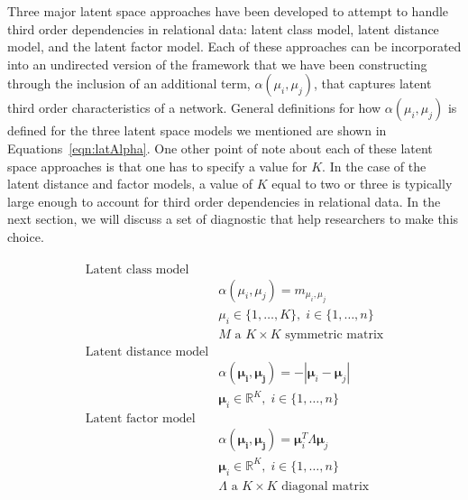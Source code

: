 Three major latent space approaches have been developed to attempt to handle third order dependencies in relational data: latent class model, latent distance model, and the latent factor model. Each of these approaches can be incorporated into an undirected version of the framework that we have been constructing through the inclusion of an additional term, $\alpha(\mu_{i}, \mu_{j})$, that captures latent third order characteristics of a network. General definitions for how $\alpha(\mu_{i}, \mu_{j})$ is defined for the three latent space models we mentioned are shown in Equations~\ref{eqn:latAlpha}. One other point of note about each of these latent space approaches is that one has to specify a value for $K$. In the case of the latent distance and factor models, a value of $K$ equal to two or three is typically large enough to account for third order dependencies in relational data. In the next section, we will discuss a set of diagnostic that help researchers to make this choice.

\begin{align}
\begin{aligned}
\text{Latent class model} \\
	&\alpha(\mu_{i}, \mu_{j}) = m_{\mu_{i}, \mu_{j}} \\
	&\mu_{i} \in \{1, \ldots, K \}, \; i \in \{1,\ldots, n\} \\
	&M \text{ a } K \times K \text{ symmetric matrix} \\
\text{Latent distance model} \\
	&\alpha(\bm{\mu_{i}}, \bm{\mu_{j}}) = -|\bm\mu_{i} - \bm\mu_{j}| \\
	&\bm\mu_{i} \in \mathbb{R}^{K}, \; i \in \{1, \ldots, n \} \\
\text{Latent factor model} \\
	&\alpha(\bm{\mu_{i}}, \bm{\mu_{j}}) = \bm\mu_{i}^{T} \Lambda \bm\mu_{j} \\
	&\bm\mu_{i} \in \mathbb{R}^{K}, \; i \in \{1, \ldots, n \} \\
	&\Lambda \text{ a } K \times K \text{ diagonal matrix}
\label{eqn:latAlpha}
\end{aligned}
\end{align}

